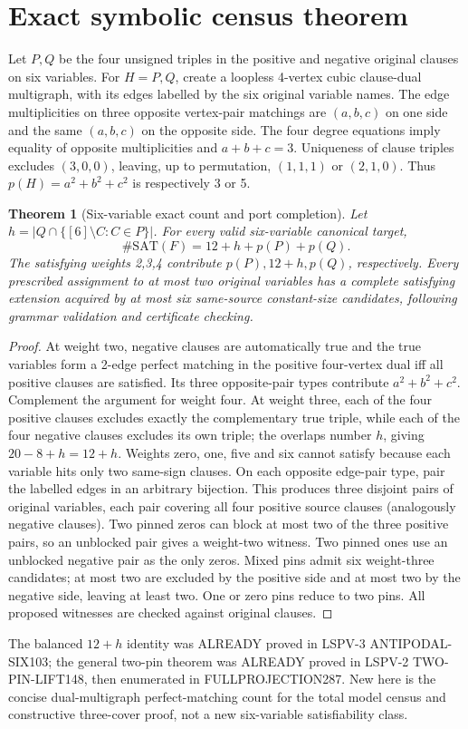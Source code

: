 \documentclass[11pt]{article}
\newtheorem{theorem}{Theorem}
\begin{document}
\section{Exact symbolic census theorem}
Let $P,Q$ be the four unsigned triples in the positive and negative original clauses on six variables. For $H=P,Q$, create a loopless 4-vertex cubic clause-dual multigraph, with its edges labelled by the six original variable names. The edge multiplicities on three opposite vertex-pair matchings are $(a,b,c)$ on one side and the same $(a,b,c)$ on the opposite side. The four degree equations imply equality of opposite multiplicities and $a+b+c=3$. Uniqueness of clause triples excludes $(3,0,0)$, leaving, up to permutation, $(1,1,1)$ or $(2,1,0)$. Thus $p(H)=a^2+b^2+c^2$ is respectively 3 or 5.
\begin{theorem}[Six-variable exact count and port completion]
Let $h=|Q\cap\{[6]\setminus C:C\in P\}|$. For every valid six-variable canonical target,
\[
\boxed{\#\mathrm{SAT}(F)=12+h+p(P)+p(Q).}
\]
The satisfying weights 2,3,4 contribute $p(P),12+h,p(Q)$, respectively. Every prescribed assignment to at most two original variables has a complete satisfying extension acquired by at most six same-source constant-size candidates, following grammar validation and certificate checking.
\end{theorem}
\begin{proof}
At weight two, negative clauses are automatically true and the true variables form a 2-edge perfect matching in the positive four-vertex dual iff all positive clauses are satisfied. Its three opposite-pair types contribute $a^2+b^2+c^2$. Complement the argument for weight four. At weight three, each of the four positive clauses excludes exactly the complementary true triple, while each of the four negative clauses excludes its own triple; the overlaps number $h$, giving $20-8+h=12+h$. Weights zero, one, five and six cannot satisfy because each variable hits only two same-sign clauses. On each opposite edge-pair type, pair the labelled edges in an arbitrary bijection. This produces three disjoint pairs of original variables, each pair covering all four positive source clauses (analogously negative clauses). Two pinned zeros can block at most two of the three positive pairs, so an unblocked pair gives a weight-two witness. Two pinned ones use an unblocked negative pair as the only zeros. Mixed pins admit six weight-three candidates; at most two are excluded by the positive side and at most two by the negative side, leaving at least two. One or zero pins reduce to two pins. All proposed witnesses are checked against original clauses.
\end{proof}
The balanced $12+h$ identity was ALREADY proved in LSPV-3 ANTIPODAL-SIX103; the general two-pin theorem was ALREADY proved in LSPV-2 TWO-PIN-LIFT148, then enumerated in FULLPROJECTION287. New here is the concise dual-multigraph perfect-matching count for the total model census and constructive three-cover proof, not a new six-variable satisfiability class.
\end{document}
